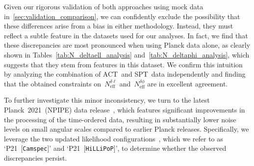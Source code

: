 \documentclass[11pt]{article}
\numberwithin{equation}{section}
\newcommand{\Nphase}{N_\mathrm{eff}^{\delta\phi}}
\newcommand{\Nmultipole}{N_\mathrm{eff}^{\delta\ell}}
\begin{document}
Given our rigorous validation of both approaches using mock data in~\textsection\ref{sec:validation_comparison}, we can confidently exclude the possibility that these differences arise from a bias in either methodology. Instead, they must reflect a subtle feature in the datasets used for our analyses. In fact, we find that these discrepancies are most pronounced when using Planck data alone, as clearly shown in Tables~\ref{tab:N_deltaell_analysis} and~\ref{tab:N_deltaphi_analysis}, which suggests that they stem from features in this dataset. We confirm this intuition by analyzing the combination of ACT~and SPT~data independently and finding that the obtained constraints on~$\Nmultipole$ and~$\Nphase$ are in excellent agreement.

To further investigate this minor inconsistency, we turn to the latest Planck~2021~(NPIPE) data release~\cite{Planck:2020olo}, which features significant improvements in the processing of the time-ordered data, resulting in substantially lower noise levels on small angular scales compared to earlier Planck releases. Specifically, we leverage the two updated likelihood configurations~\cite{Efstathiou:2019mdh, Rosenberg:2022sdy, Tristram:2020wbi, Tristram:2023haj}, which we refer to as `P21~[\texttt{Camspec}]' and `P21~[\texttt{HiLLiPoP}]', to determine whether the observed discrepancies persist.\medskip
\end{document}
